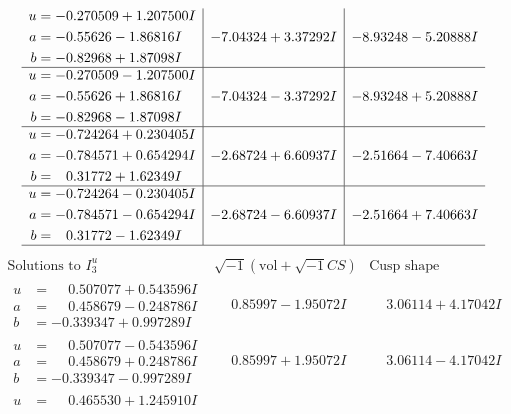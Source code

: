 \documentclass[1p]{elsarticle_modified}
\theoremstyle{definition}
\newcommand{\I}{\sqrt{-1}}
\begin{document}
$$\begin{array}{c|c|c}
\begin{aligned}
u &= -0.270509 + 1.207500 I \\
a &= -0.55626 - 1.86816 I \\
b &= -0.82968 + 1.87098 I\end{aligned}
 & -7.04324 + 3.37292 I & -8.93248 - 5.20888 I \\ \hline\begin{aligned}
u &= -0.270509 - 1.207500 I \\
a &= -0.55626 + 1.86816 I \\
b &= -0.82968 - 1.87098 I\end{aligned}
 & -7.04324 - 3.37292 I & -8.93248 + 5.20888 I \\ \hline\begin{aligned}
u &= -0.724264 + 0.230405 I \\
a &= -0.784571 + 0.654294 I \\
b &= \phantom{-}0.31772 + 1.62349 I\end{aligned}
 & -2.68724 + 6.60937 I & -2.51664 - 7.40663 I \\ \hline\begin{aligned}
u &= -0.724264 - 0.230405 I \\
a &= -0.784571 - 0.654294 I \\
b &= \phantom{-}0.31772 - 1.62349 I\end{aligned}
 & -2.68724 - 6.60937 I & -2.51664 + 7.40663 I\\
 \hline 
 \end{array}$$\newpage$$\begin{array}{c|c|c}  
\text{Solutions to }I^u_{3}& \I (\text{vol} + \sqrt{-1}CS) & \text{Cusp shape}\\
 \hline 
\begin{aligned}
u &= \phantom{-}0.507077 + 0.543596 I \\
a &= \phantom{-}0.458679 - 0.248786 I \\
b &= -0.339347 + 0.997289 I\end{aligned}
 & \phantom{-}0.85997 - 1.95072 I & \phantom{-}3.06114 + 4.17042 I \\ \hline\begin{aligned}
u &= \phantom{-}0.507077 - 0.543596 I \\
a &= \phantom{-}0.458679 + 0.248786 I \\
b &= -0.339347 - 0.997289 I\end{aligned}
 & \phantom{-}0.85997 + 1.95072 I & \phantom{-}3.06114 - 4.17042 I \\ \hline\begin{aligned}
u &= \phantom{-}0.465530 + 1.245910 I \\

\end{aligned}
\end{array}$$
\end{document}
